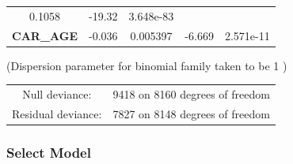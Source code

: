 \documentclass[]{article}
\begin{document}
\begin{longtable}[]{@{}ccccc@{}}
\begin{minipage}[t]{0.14\columnwidth}
0.1058\strut
\end{minipage} & \begin{minipage}[t]{0.11\columnwidth}\centering\strut
-19.32\strut
\end{minipage} & \begin{minipage}[t]{0.12\columnwidth}\centering\strut
3.648e-83\strut
\end{minipage}\tabularnewline
\begin{minipage}[t]{0.33\columnwidth}\centering\strut
\textbf{CAR\_AGE}\strut
\end{minipage} & \begin{minipage}[t]{0.14\columnwidth}\centering\strut
-0.036\strut
\end{minipage} & \begin{minipage}[t]{0.14\columnwidth}\centering\strut
0.005397\strut
\end{minipage} & \begin{minipage}[t]{0.11\columnwidth}\centering\strut
-6.669\strut
\end{minipage} & \begin{minipage}[t]{0.12\columnwidth}\centering\strut
2.571e-11\strut
\end{minipage}\tabularnewline
\bottomrule
\end{longtable}

(Dispersion parameter for binomial family taken to be 1 )

\begin{longtable}[]{@{}cc@{}}
\toprule
\begin{minipage}[t]{0.27\columnwidth}\centering\strut
Null deviance:\strut
\end{minipage} & \begin{minipage}[t]{0.35\columnwidth}\centering\strut
9418 on 8160 degrees of freedom\strut
\end{minipage}\tabularnewline
\begin{minipage}[t]{0.27\columnwidth}\centering\strut
Residual deviance:\strut
\end{minipage} & \begin{minipage}[t]{0.35\columnwidth}\centering\strut
7827 on 8148 degrees of freedom\strut
\end{minipage}\tabularnewline
\bottomrule
\end{longtable}

\subsubsection{Select Model}\label{select-model}
\end{document}
